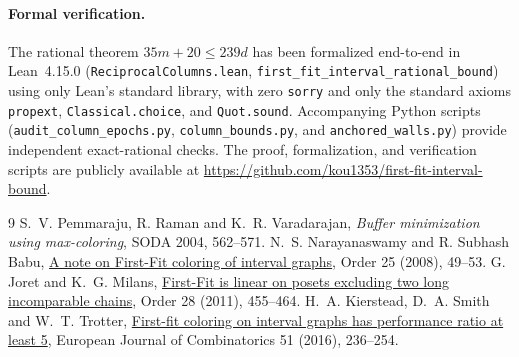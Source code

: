 \documentclass[11pt]{article}
\begin{document}
\paragraph{Formal verification.}
The rational theorem $35m+20\le 239d$ has been formalized end-to-end in Lean~4.15.0 (\texttt{ReciprocalColumns.lean}, \texttt{first\_fit\_interval\_rational\_bound}) using only Lean's standard library, with zero \texttt{sorry} and only the standard axioms \texttt{propext}, \texttt{Classical.choice}, and \texttt{Quot.sound}. Accompanying Python scripts (\texttt{audit\_column\_epochs.py}, \texttt{column\_bounds.py}, and \texttt{anchored\_walls.py}) provide independent exact-rational checks. The proof, formalization, and verification scripts are publicly available at \url{https://github.com/kou1353/first-fit-interval-bound}.

\begin{thebibliography}{9}
 S.~V. Pemmaraju, R. Raman and K.~R. Varadarajan,
\emph{Buffer minimization using max-coloring}, SODA 2004, 562--571.
 N.~S. Narayanaswamy and R. Subhash Babu,
\href{https://doi.org/10.1007/s11083-008-9076-6}{A note on First-Fit
coloring of interval graphs}, Order 25 (2008), 49--53.
 G. Joret and K.~G. Milans,
\href{https://arxiv.org/abs/1006.5704}{First-Fit is linear on posets excluding
two long incomparable chains}, Order 28 (2011), 455--464.
 H.~A. Kierstead, D.~A. Smith and W.~T. Trotter,
\href{https://arxiv.org/abs/1506.00192}{First-fit coloring on interval
graphs has performance ratio at least 5}, European Journal of
Combinatorics 51 (2016), 236--254.
\end{thebibliography}
\end{document}
